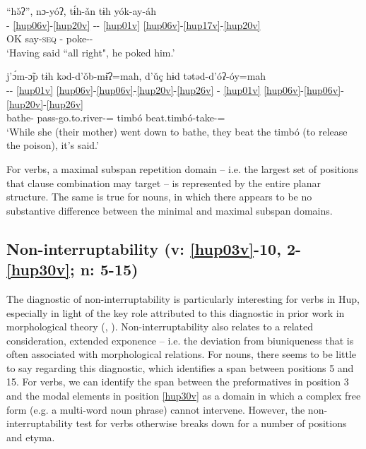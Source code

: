 \documentclass[output=paper]{langscibook}
\begin{document}
\ea\label{ex:hup:key:25}
    \glll ``hǝ̌ʔ'', nɔ-yóʔ, tɨ́h-ǎn tɨh yók-ay-áh\\ 
    - \ref{hup06v}-\ref{hup20v} -{}- \ref{hup01v} \ref{hup06v}-\ref{hup17v}-\ref{hup20v} \\
    OK say-\textsc{seq} \Sg-\Obj{} \Third\Sg{} poke-\Inch-\Decl{} \\
    \glt `Having said ``all right", he poked him.'
\z 

\ea\label{ex:hup:key:26} 
    \glll j'ɔ́m-ɔ̃p tɨh kǝd-d'ǒb-mɨ̌ʔ=mah, d'ǔç hɨd tǝtǝd-d'óʔ-óy=mah\\ 
    -{}- \ref{hup01v} \ref{hup06v}-\ref{hup06v}-\ref{hup20v}-\ref{hup26v} - \ref{hup01v} \ref{hup06v}-\ref{hup06v}-\ref{hup20v}-\ref{hup26v}\\
    bathe-\Dep{} \Third\Sg{} pass-go.to.river-\Sim=\Rep{} timbó \Third\Pl{} beat.timbó-take-\Dynm=\Rep{}\\ 
    \glt `While she (their mother) went down to bathe, they beat the timbó (to release the poison), it's said.'
\z 

For verbs, a maximal subspan repetition domain – i.e. the largest set of positions that clause combination may target – is represented by the entire planar structure. The same is true for nouns, in which there appears to be no substantive difference between the minimal and maximal subspan domains. 

\subsection{Non-interruptability (v: \ref{hup03v}-10, 2-\ref{hup30v}; n: 5-15)} \label{sec:hup:key:4.5}

The diagnostic of non-interruptability is particularly interesting for verbs in Hup, especially in light of the key role attributed to this diagnostic in prior work in morphological theory (\citealt{Booij2009}, \citealt[17]{Bauer2017}). Non-interruptability also relates to a related consideration, extended exponence – i.e. the deviation from biuniqueness that is often associated with morphological relations. For nouns, there seems to be little to say regarding this diagnostic, which identifies a span between positions 5 and 15. For verbs, we can identify the span between the preformatives in position 3 and the modal elements in position \ref{hup30v} as a domain in which a complex free form (e.g. a multi-word noun phrase) cannot intervene. However, the non-interruptability test for verbs otherwise breaks down for a number of positions and etyma.
\end{document}
